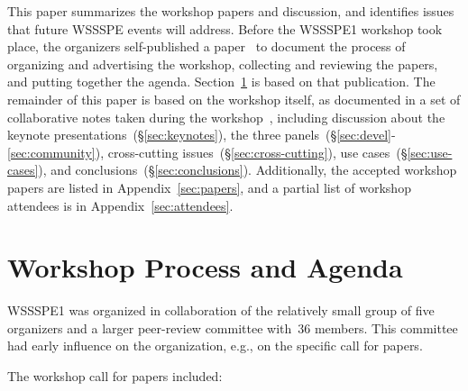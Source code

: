 \documentclass[11pt, oneside]{amsart}
\begin{document}
This paper summarizes the  workshop papers
and discussion, and identifies issues that future WSSSPE events will address.
Before the WSSSPE1 workshop took place, the organizers self-published
a paper~\cite{WSSSPE1-pre-report} to document the process of
organizing and advertising the workshop, collecting and reviewing the
papers, and putting together the agenda. Section~\ref{sec:process} is
based on that publication. The remainder of this paper is based on the
workshop itself, as documented in a set of collaborative notes taken
during the workshop~\cite{WSSSPE1-google-notes}, including discussion
about the keynote presentations~(\S\ref{sec:keynotes}), the three
panels~(\S\ref{sec:devel}-\ref{sec:community}), 
cross-cutting issues~(\S\ref{sec:cross-cutting}),
use cases~(\S\ref{sec:use-cases}), and conclusions~(\S\ref{sec:conclusions}).  
Additionally, the accepted workshop papers are listed in
Appendix~\ref{sec:papers}, and a partial list of workshop attendees is
in Appendix~\ref{sec:attendees}.


\section{Workshop Process and Agenda} \label{sec:process}

WSSSPE1 was organized in collaboration of the relatively small group
of five organizers and a larger peer-review committee with~36
members. This committee had early influence on the organization, e.g.,
on the specific call for papers.

The workshop call for papers included:
\end{document}
